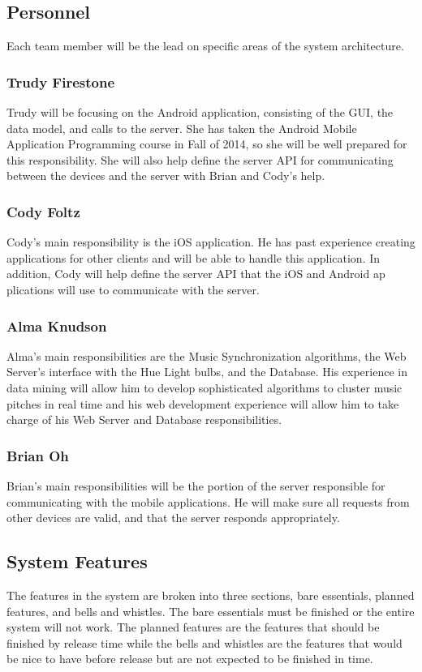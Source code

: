 \documentclass[12pt]{article}
\begin{document}
\subsection{Personnel}
Each team member will be the lead on specific areas of the system architecture.
\subsubsection*{Trudy Firestone}
Trudy will be focusing on the Android application, consisting of the GUI, the data model, and calls to the server. She has taken the Android Mobile Application Programming course in Fall of 2014, so she will be well prepared for this responsibility. She will also help define the server API for communicating between the devices and the server with Brian and Cody's help. 
\subsubsection*{Cody Foltz}
Cody's main responsibility is the iOS application.  He has past experience creating applications for other clients and will be able to handle this application.  In addition, Cody will help define the server API that the iOS and Android ap
plications will use to communicate with the server.

\subsubsection*{Alma Knudson}
Alma's main responsibilities are the Music Synchronization algorithms, the Web Server's interface with the Hue Light bulbs, and the Database. His experience in data mining will allow him to develop sophisticated algorithms to cluster music pitches in real time and his web development experience will allow him to take charge of his Web Server and Database responsibilities. 

\subsubsection*{Brian Oh}
Brian's main responsibilities will be the portion of the server responsible for communicating with the mobile applications. He will make sure all requests from other devices are valid, and that the server responds appropriately.

\subsection{System Features}
The features in the system are broken into three sections, bare essentials, planned features, and bells and whistles.  The bare essentials must be finished or the entire system will not work.  The planned features are the features that should be finished by release time while the bells and whistles are the features that would be nice to have before release but are not expected to be finished in time.
\end{document}
